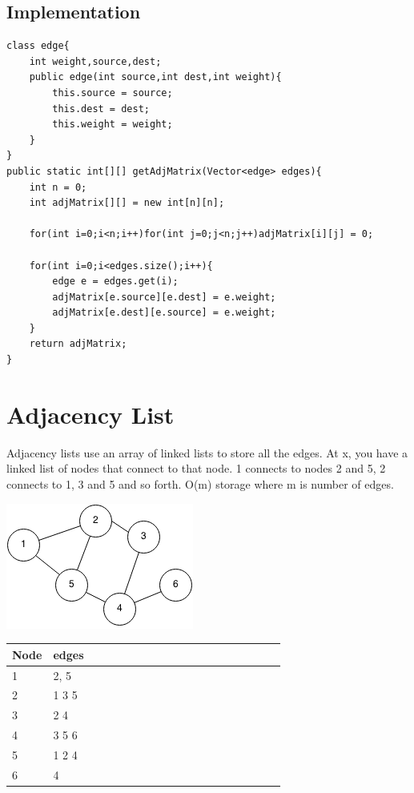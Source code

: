 \documentclass[11pt,oneside]{book}
\makeatletter
\def\maxwidth#1{\ifdim\Gin@nat@width>#1 #1\else\Gin@nat@width\fi}
\makeatother
\begin{document}
\subsection{Implementation}

\begin{lstlisting}
class edge{
    int weight,source,dest;
    public edge(int source,int dest,int weight){
        this.source = source;
        this.dest = dest;
        this.weight = weight;
    }
}
public static int[][] getAdjMatrix(Vector<edge> edges){
    int n = 0;
    int adjMatrix[][] = new int[n][n];
    
    for(int i=0;i<n;i++)for(int j=0;j<n;j++)adjMatrix[i][j] = 0;
    
    for(int i=0;i<edges.size();i++){
        edge e = edges.get(i);
        adjMatrix[e.source][e.dest] = e.weight;
        adjMatrix[e.dest][e.source] = e.weight;
    }
    return adjMatrix;
}
\end{lstlisting}

        \section{ Adjacency List }
        

Adjacency lists use an array of linked lists to store all the edges. At x, you have a linked list of nodes that connect to 
that node. 1 connects to nodes 2 and 5, 2 connects to 1, 3 and 5 and so forth. O(m) storage where m is number of edges.

\vspace{5px}\includegraphics[width=\maxwidth{\textwidth}]{graph.png}

\vspace{10px}\begin{tabulary}{0.4\linewidth}{|l|l|l|l|l|l|l|l|l|l|l|l|l|l|l|l|l|l|l}\hline


  Node &
  edges\\
\hline


  1 &
  2, 5\\

  2 &
  1 3 5\\

  3 &
  2 4\\

  4 &
  3 5 6\\

  5 &
  1 2 4\\

  6 &
  4\\

\hline\end{tabulary}
\end{document}
